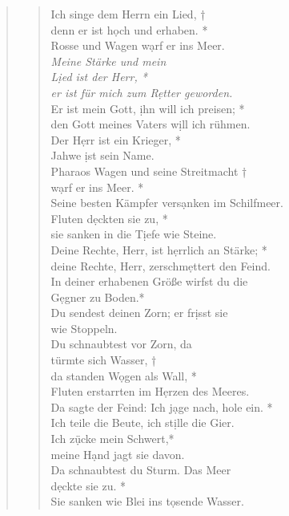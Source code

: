 \begin{quote}
\begin{verse}


Ich singe dem Herrn ein Lied, †\\
denn er ist h\d och und erhaben. *\\ 
Rosse und Wagen w\d arf er ins Meer.\\
\vin \textit{Meine Stärke und mein \\ \vin L\d ied ist der Herr, *\\
\vin er ist für mich zum R\d etter geworden.} \\
Er ist mein Gott, \d ihn will ich preisen; *\\ 
den Gott meines Vaters w\d ill ich rühmen. \\
\vin Der H\d err ist ein Krieger, *\\
\vin Jahwe \d ist sein Name.\\
Pharaos Wagen und seine Streitmacht †\\
w\d arf er ins Meer. *\\ 
Seine besten Kämpfer vers\d anken im Schilfmeer.\\
\vin Fluten d\d eckten sie zu, *\\
\vin sie sanken in die T\d iefe wie Steine.\\
Deine Rechte, Herr, ist h\d errlich an Stärke; *\\
deine Rechte, Herr, zerschm\d ettert den Feind.\\
\vin In deiner erhabenen Größe wirfst  du die \\ \vin G\d egner zu Boden.*\\
\vin Du sendest deinen Zorn; er  fr\d isst sie \\ \vin wie Stoppeln.\\
Du schnaubtest vor Zorn, da  \\türmte sich Wasser, †\\
 da standen W\d ogen als Wall, *\\
Fluten erstarrten im H\d erzen des Meeres.\\
\vin Da sagte der Feind:  Ich j\d age nach, hole ein. *\\
\vin Ich teile die Beute, ich st\d ille die Gier. \\
 Ich z\d ücke mein Schwert,*\\
 meine H\d and jagt sie davon.\\
\vin Da schnaubtest du Sturm. Das  Meer \\ \vin d\d eckte sie zu. *\\
\vin Sie sanken wie Blei ins t\d osende Wasser.\\


\end{verse}
\end{quote}
